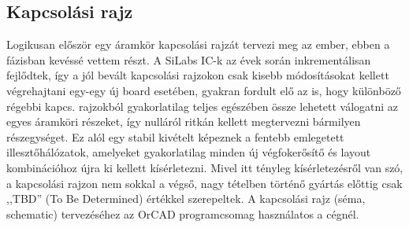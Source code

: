         \subsection{Kapcsolási rajz}
            Logikusan először egy áramkör kapcsolási rajzát tervezi meg az ember, ebben a fázisban kevéssé vettem részt. A SiLabs IC-k az évek során inkrementálisan fejlődtek, így a jól bevált kapcsolási rajzokon csak kisebb módosításokat kellett végrehajtani egy-egy új board esetében, gyakran fordult elő az is, hogy különböző régebbi kapcs. rajzokból gyakorlatilag teljes egészében össze lehetett válogatni az egyes áramköri részeket, így nulláról ritkán kellett megtervezni bármilyen részegységet. Ez alól egy stabil kivételt képeznek a fentebb emlegetett illesztőhálózatok, amelyeket gyakorlatilag minden új végfokerősítő és layout kombinációhoz újra ki kellett kísérletezni. Mivel itt tényleg kísérletezésről van szó, a kapcsolási rajzon nem sokkal a végső, nagy tételben történő gyártás előttig csak ,,TBD'' (To Be Determined) értékkel szerepeltek. A kapcsolási rajz (séma, schematic) tervezéséhez az OrCAD \cite{OrCAD} programcsomag használatos a cégnél.
